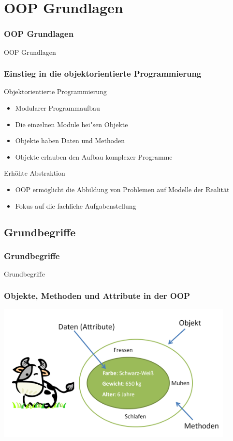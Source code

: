 
\section{OOP Grundlagen}
\begin{frame}[fragile]
	\frametitle{OOP Grundlagen}
	\huge OOP Grundlagen
\end{frame}

\begin{frame}
\frametitle{Einstieg in die objektorientierte Programmierung}
	\begin{block}{Objektorientierte Programmierung}
		\begin{itemize}
		  \item Modularer Programmaufbau
		  \item Die einzelnen Module hei"sen Objekte
		  \item Objekte haben Daten und Methoden
		  \item Objekte erlauben den Aufbau komplexer Programme
		\end{itemize}
	\end{block}
	\begin{exampleblock}{Erh\"ohte Abstraktion}
		\begin{itemize}
		  \item OOP erm\"oglicht die Abbildung von Problemen auf Modelle der Realit\"at 
		  \item Fokus auf die fachliche Aufgabenstellung
		\end{itemize}
	\end{exampleblock} 
\end{frame} 

\subsection{Grundbegriffe}
\begin{frame}[fragile]
	\frametitle{Grundbegriffe}
	\huge Grundbegriffe
\end{frame}
\begin{frame}
\frametitle{Objekte, Methoden und Attribute in der OOP}
	\center
	\includegraphics[width=0.9\textwidth, keepaspectratio=true]{bilder/kuh.png}
\end{frame}  
  
